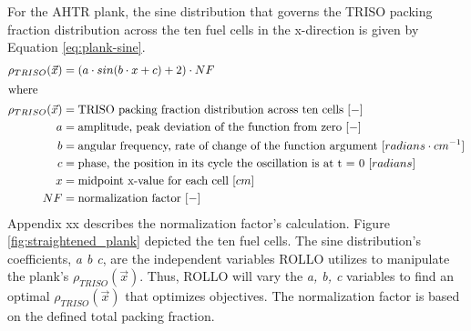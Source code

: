 For the \gls{AHTR} plank, the sine distribution that governs the \gls{TRISO} packing 
fraction distribution across the ten fuel cells in the x-direction is given by 
Equation \ref{eq:plank-sine}.
\begin{align}
    \label{eq:plank-sine}
    \rho_{TRISO}(\vec{x}) &= \left(a\cdot sin(b\cdot x + c) + 2\right) \cdot NF\\
    \intertext{where}
    \rho_{TRISO}(\vec{x}) &= \mbox{TRISO packing fraction distribution across ten cells } [-] \nonumber \\ 
    a &= \mbox{amplitude, peak deviation of the function from zero } [-] \nonumber \\
    b &= \mbox{angular frequency, rate of change of the function argument } [radians \cdot cm^{-1}] \nonumber \\
    c &= \mbox{phase, the position in its cycle the oscillation is at t = 0 } [radians]\nonumber \\
    x &= \mbox{midpoint x-value for each cell } [cm]\nonumber \\
    NF &= \mbox{normalization factor } [-]\nonumber
\end{align}
Appendix xx describes the normalization factor's calculation. 
Figure \ref{fig:straightened_plank} depicted the ten fuel cells.
The sine distribution's coefficients, \textit{a b c}, are the independent variables 
\gls{ROLLO} utilizes to manipulate the plank's $\rho_{TRISO}(\vec{x})$.
Thus, \gls{ROLLO} will vary the \textit{a, b, c} variables to find an optimal 
$\rho_{TRISO}(\vec{x})$ that optimizes objectives. 
The normalization factor is based on the defined total packing fraction.

